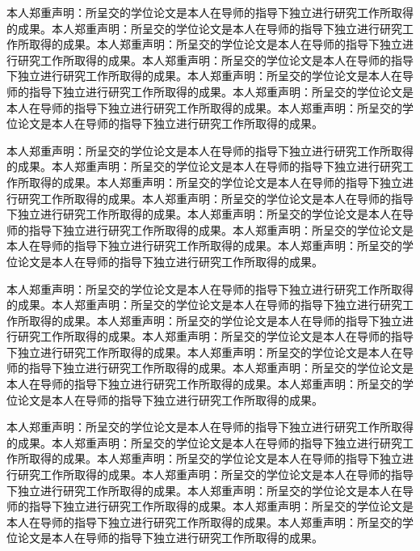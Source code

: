 \documentclass[class = professional, twoside, AutoFakeBold=3.17,AutoFakeSlant=0.2]{gdufe_master_thesis}
\begin{document}
本人郑重声明：所呈交的学位论文是本人在导师的指导下独立进行研究工作所取得的成果。本人郑重声明：所呈交的学位论文是本人在导师的指导下独立进行研究工作所取得的成果。本人郑重声明：所呈交的学位论文是本人在导师的指导下独立进行研究工作所取得的成果。本人郑重声明：所呈交的学位论文是本人在导师的指导下独立进行研究工作所取得的成果。本人郑重声明：所呈交的学位论文是本人在导师的指导下独立进行研究工作所取得的成果。本人郑重声明：所呈交的学位论文是本人在导师的指导下独立进行研究工作所取得的成果。本人郑重声明：所呈交的学位论文是本人在导师的指导下独立进行研究工作所取得的成果。
    \the\baselineskip

 本人郑重声明：所呈交的学位论文是本人在导师的指导下独立进行研究工作所取得的成果。本人郑重声明：所呈交的学位论文是本人在导师的指导下独立进行研究工作所取得的成果。本人郑重声明：所呈交的学位论文是本人在导师的指导下独立进行研究工作所取得的成果。本人郑重声明：所呈交的学位论文是本人在导师的指导下独立进行研究工作所取得的成果。本人郑重声明：所呈交的学位论文是本人在导师的指导下独立进行研究工作所取得的成果。本人郑重声明：所呈交的学位论文是本人在导师的指导下独立进行研究工作所取得的成果。本人郑重声明：所呈交的学位论文是本人在导师的指导下独立进行研究工作所取得的成果。
    \the\baselineskip

{ 本人郑重声明：所呈交的学位论文是本人在导师的指导下独立进行研究工作所取得的成果。本人郑重声明：所呈交的学位论文是本人在导师的指导下独立进行研究工作所取得的成果。本人郑重声明：所呈交的学位论文是本人在导师的指导下独立进行研究工作所取得的成果。本人郑重声明：所呈交的学位论文是本人在导师的指导下独立进行研究工作所取得的成果。本人郑重声明：所呈交的学位论文是本人在导师的指导下独立进行研究工作所取得的成果。本人郑重声明：所呈交的学位论文是本人在导师的指导下独立进行研究工作所取得的成果。本人郑重声明：所呈交的学位论文是本人在导师的指导下独立进行研究工作所取得的成果。
\the\baselineskip}

本人郑重声明：所呈交的学位论文是本人在导师的指导下独立进行研究工作所取得的成果。本人郑重声明：所呈交的学位论文是本人在导师的指导下独立进行研究工作所取得的成果。本人郑重声明：所呈交的学位论文是本人在导师的指导下独立进行研究工作所取得的成果。本人郑重声明：所呈交的学位论文是本人在导师的指导下独立进行研究工作所取得的成果。本人郑重声明：所呈交的学位论文是本人在导师的指导下独立进行研究工作所取得的成果。本人郑重声明：所呈交的学位论文是本人在导师的指导下独立进行研究工作所取得的成果。本人郑重声明：所呈交的学位论文是本人在导师的指导下独立进行研究工作所取得的成果。
\the\baselineskip
\end{document}
